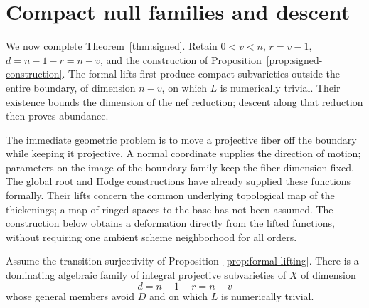\section{Compact null families and descent}
\label{sg:descent}

We now complete Theorem~\ref{thm:signed}.  Retain $0<v<n$,
$r=v-1$, $d=n-1-r=n-v$, and the construction of
Proposition~\ref{prop:signed-construction}.  The formal lifts
first produce compact subvarieties outside the entire boundary,
of dimension $n-v$, on which $L$ is numerically trivial.
Their existence bounds the dimension of the nef reduction;
descent along that reduction then proves abundance.

The immediate geometric problem is to move a projective fiber off the
boundary while keeping it projective. A normal coordinate supplies the
direction of motion; parameters on the image of the boundary family keep
the fiber dimension fixed. The global root and Hodge constructions have
already supplied these functions formally. Their lifts concern the common
underlying topological map of the thickenings; a map of ringed spaces to
the base has not been assumed. The construction below obtains a deformation
directly from the lifted functions, without requiring one ambient scheme
neighborhood for all orders.

\begin{proposition}\label{prop:null-family}
Assume the transition surjectivity of
Proposition~\ref{prop:formal-lifting}.  There is a dominating
algebraic family of integral projective subvarieties of $X$
of dimension
\[
 d=n-1-r=n-v
\]
whose general members avoid $D$ and on which $L$ is
numerically trivial.
\end{proposition}

